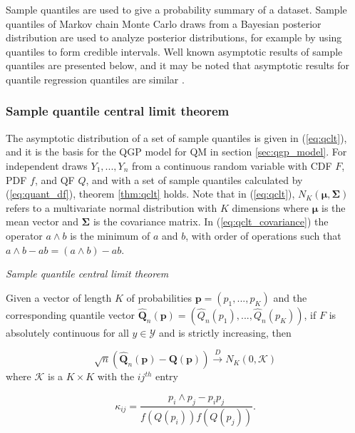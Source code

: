 Sample quantiles are used to give a probability summary of a dataset. Sample 
quantiles of Markov chain Monte Carlo draws from a Bayesian posterior 
distribution are used to analyze posterior distributions, for example by using 
quantiles to form credible intervals. 
Well known asymptotic results of sample quantiles are presented below, and it 
may be noted that asymptotic results for quantile regression quantiles are 
similar \cite[]{kocherginsky2005practical, koenker1978regression}. 

\subsubsection{Sample quantile central limit theorem} 

The asymptotic distribution of a set of sample quantiles is given in 
(\ref{eq:qclt}), and it is the basis for the QGP model for QM in section 
\ref{sec:qgp_model}. For independent draws $Y_1, ..., Y_n$ from a continuous 
random variable with CDF $F$, PDF $f$, and QF $Q$, and with a set of sample 
quantiles calculated by (\ref{eq:quant_df}), theorem \ref{thm:qclt} holds. 
Note that in (\ref{eq:qclt}), 
$N_K(\boldsymbol{\mu}, \boldsymbol{\Sigma})$ refers to a 
multivariate 
normal distribution with $K$ dimensions where $\boldsymbol{\mu}$ is the mean
vector and $\boldsymbol{\Sigma}$ is the covariance matrix. 
In (\ref{eq:qclt_covariance}) the 
operator $a \wedge b$ is the minimum of $a$ and $b$, with order of operations
such that $a \wedge b - ab = (a \wedge b) - ab$. 


\begin{theorem}{\emph{Sample quantile central limit theorem}}
\label{thm:qclt}

Given a vector of length $K$ of probabilities 
$\boldsymbol{p} = (p_1, ..., p_K)$ and the corresponding quantile vector 
$\hat{\boldsymbol{Q}}_n(\boldsymbol{p}) = (\hat{Q}_n(p_1), ..., \hat{Q}_n(p_K))$, 
if $F$ is absolutely continuous for all $y \in \mathcal{Y}$ and is strictly 
increasing, then

\begin{equation}
    \label{eq:qclt}
    \sqrt{n}(\hat{\boldsymbol{Q}}_n(\boldsymbol{p}) - 
    \boldsymbol{Q}(\boldsymbol{p})) \overset{D}{\rightarrow} 
    N_K(0, \boldsymbol{\mathcal{K}})
\end{equation}
where $\boldsymbol{\mathcal{K}}$ is a $K\times K$ with the $ij^{th}$ 
entry 

\begin{equation}
    \label{eq:qclt_covariance}
    \kappa_{ij} = \frac{p_i \wedge p_j - p_i p_j}{f(Q(p_i)) f(Q(p_j))}.
\end{equation}
\end{theorem}

